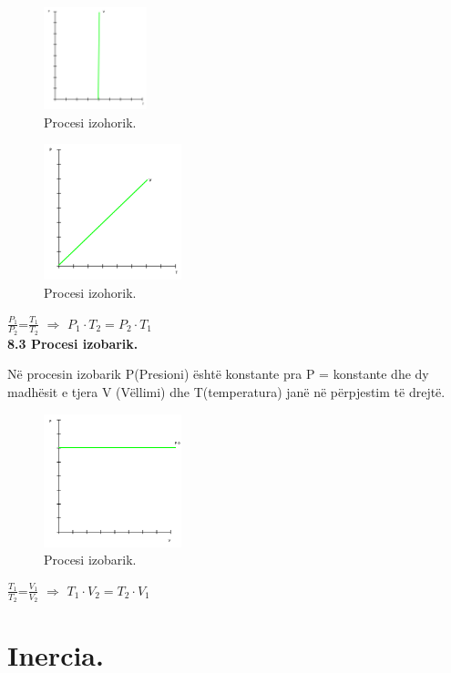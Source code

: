 \documentclass[twocolumn]{article}
\begin{document}
	\begin{figure}[h]
		\includegraphics[width=30mm]{Imazhet/procesi izohorik.png}
		\caption{Procesi izohorik.}
		\label{fig:boat1}
	\end{figure}
	
	\begin{figure}[h]
		\includegraphics[width=40mm]{Imazhet/procesi izohorik1.png}
		\caption{Procesi izohorik.}
		\label{fig:boat1}
	\end{figure}
	
	$\frac{P_1}{P_2}$=$\frac{T_1}{T_2}$ $\Rightarrow$ $P_1 \cdot T_2=P_2 \cdot T_1$\\
	
	\textbf{8.3 Procesi izobarik.}
	
	Në procesin izobarik P(Presioni) është konstante pra P = konstante dhe dy madhësit
	e tjera V (Vëllimi) dhe T(temperatura) janë në përpjestim të drejtë.
	
	\begin{figure}[h]
		\includegraphics[width=40mm]{Imazhet/procesi izobarik.png}
		\caption{Procesi izobarik.}
		\label{fig:boat1}
	\end{figure}
	
	$\frac{T_1}{T_2}$=$\frac{V_1}{V_2}$ $\Rightarrow$ $T_1 \cdot V_2=T_2 \cdot V_1$\\
	
	\section{Inercia.}
	
\end{document}
